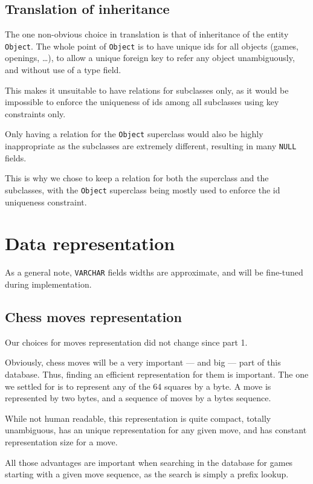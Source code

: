 \documentclass{article}
\begin{document}
\subsection{Translation of inheritance}
The one non-obvious choice in translation is that of inheritance of the entity \verb|Object|.
The whole point of \verb|Object| is to have unique ids for all objects (games, openings, \dots),
to allow a unique foreign key to refer any object unambiguously, and without use of a type field.

This makes it unsuitable to have relations for subclasses only, as it would be impossible to
enforce the uniqueness of ids among all subclasses using key constraints only.

Only having a relation for the \verb|Object| superclass would also be highly inappropriate
as the subclasses are extremely different, resulting in many \verb|NULL| fields.

This is why we chose to keep a relation for both the superclass and the subclasses, with the \verb|Object| superclass
being mostly used to enforce the id uniqueness constraint.


\section{Data representation}
As a general note, \verb|VARCHAR| fields widths are approximate, and will be fine-tuned during implementation.

\subsection{Chess moves representation}
Our choices for moves representation did not change since part 1.

Obviously, chess moves will be a very important --- and big --- part of this database.
Thus, finding an efficient representation for them is important.
The one we settled for is to represent any of the 64 squares by a byte.
A move is represented by two bytes, and a sequence of moves by a bytes sequence.

While not human readable, this representation is quite compact, totally unambiguous,
has an unique representation for any given move, and has constant representation
size for a move.

All those advantages are important when searching in the database for games starting
with a given move sequence, as the search is simply a prefix lookup.
\end{document}
